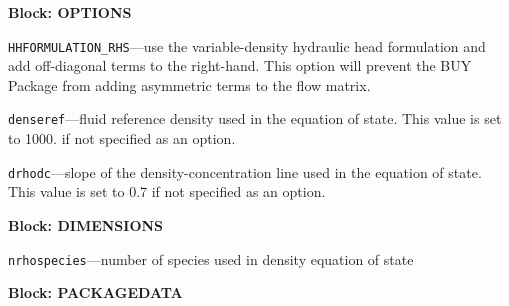 
\item \textbf{Block: OPTIONS}

\begin{description}
\item \texttt{HHFORMULATION\_RHS}---use the variable-density hydraulic head formulation and add off-diagonal terms to the right-hand.  This option will prevent the BUY Package from adding asymmetric terms to the flow matrix.

\item \texttt{denseref}---fluid reference density used in the equation of state.  This value is set to 1000. if not specified as an option.

\item \texttt{drhodc}---slope of the density-concentration line used in the equation of state.  This value is set to 0.7 if not specified as an option.

\end{description}
\item \textbf{Block: DIMENSIONS}

\begin{description}
\item \texttt{nrhospecies}---number of species used in density equation of state

\end{description}
\item \textbf{Block: PACKAGEDATA}

